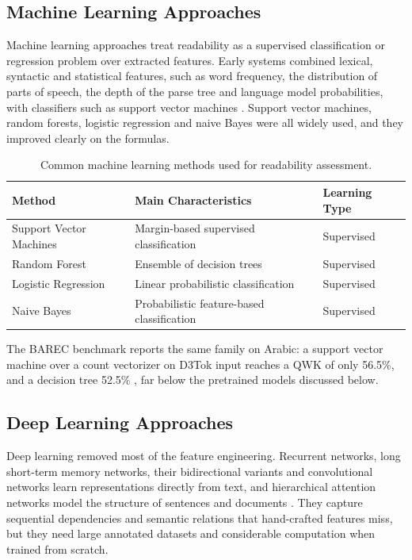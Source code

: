 \subsection{Machine Learning Approaches}

Machine learning approaches treat readability as a supervised classification or regression
problem over extracted features. Early systems combined lexical, syntactic and statistical
features, such as word frequency, the distribution of parts of speech, the depth of the parse
tree and language model probabilities, with classifiers such as support vector machines
\cite{schwarm2005reading,collins2004language}. Support vector machines, random forests, logistic
regression and naive Bayes were all widely used, and they improved clearly on the formulas.

\begin{table}[H]
\centering
\caption{Common machine learning methods used for readability assessment.}
\label{tab:ml_readability}
\begin{tabular}{p{3.6cm} p{5.6cm} p{2.2cm}}
\toprule
\textbf{Method} & \textbf{Main Characteristics} & \textbf{Learning Type} \\
\midrule
Support Vector Machines & Margin-based supervised classification & Supervised \\
Random Forest & Ensemble of decision trees & Supervised \\
Logistic Regression & Linear probabilistic classification & Supervised \\
Naive Bayes & Probabilistic feature-based classification & Supervised \\
\bottomrule
\end{tabular}
\end{table}

The BAREC benchmark reports the same family on Arabic: a support vector machine over a count
vectorizer on D3Tok input reaches a QWK of only 56.5\%, and a decision tree 52.5\%
\cite{elmadani2025barec}, far below the pretrained models discussed below.

\subsection{Deep Learning Approaches}

Deep learning removed most of the feature engineering. Recurrent networks, long short-term memory
networks, their bidirectional variants and convolutional networks learn representations directly
from text, and hierarchical attention networks model the structure of sentences and documents
\cite{martinc2021supervised}. They capture sequential dependencies and semantic relations that
hand-crafted features miss, but they need large annotated datasets and considerable computation
when trained from scratch.

